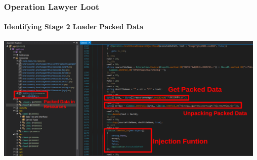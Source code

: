 \documentclass[aspectratio=169]{beamer}
\begin{document}
{
\begin{frame}
  \frametitle{Operation Lawyer Loot}
  \framesubtitle{Identifying Stage 2 Loader Packed Data}
  \begin{center}
    \includegraphics[width=14cm]{kpot-unpacking-4}
  \end{center}
\end{frame}
}
\end{document}

